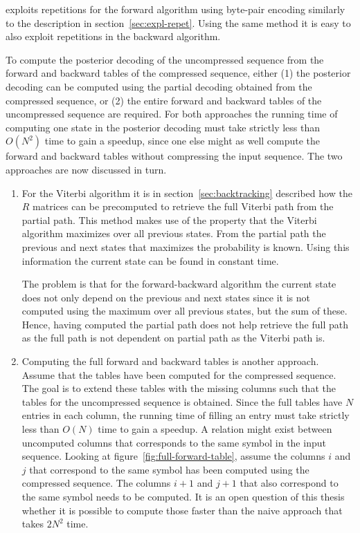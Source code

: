 \citet{sand2013ziphmmlib} exploits repetitions for the forward algorithm using
byte-pair encoding similarly to the description in
section~\ref{sec:expl-repet}. Using the same method it is easy to also exploit
repetitions in the backward algorithm.

To compute the posterior decoding of the uncompressed sequence from the
forward and backward tables of the compressed sequence, either (1) the
posterior decoding can be computed using the partial decoding obtained
from the compressed sequence, or (2) the entire forward and backward tables of
the uncompressed sequence are required. For both approaches the running time of
computing one state in the posterior decoding must take strictly less than
$O(N^2)$ time to gain a speedup, since one else might as well compute the
forward and backward tables without compressing the input sequence. The two
approaches are now discussed in turn.

\begin{enumerate}
\item For the Viterbi algorithm it is in section~\ref{sec:backtracking}
  described how the $R$ matrices can be precomputed to retrieve the full
  Viterbi path from the partial path. This method makes use of the property
  that the Viterbi algorithm maximizes over all previous states. From the
  partial path the previous and next states that maximizes the probability is
  known. Using this information the current state can be found in constant
  time.

  The problem is that for the forward-backward algorithm the current state does
  not only depend on the previous and next states since it is not computed using the
  maximum over all previous states, but the sum of these. Hence, having computed
  the partial path does not help retrieve the full path as the full path is
  not dependent on partial path as the Viterbi path is.
\item Computing the full forward and backward tables is another approach.
  Assume that the tables have been computed for the compressed sequence. The
  goal is to extend these tables with the missing columns such that the tables
  for the uncompressed sequence is obtained. Since the full tables have $N$
  entries in each column, the running time of filling an entry must take
  strictly less than $O(N)$ time to gain a speedup. A relation might exist
  between uncomputed columns that corresponds to the same symbol in the input
  sequence. Looking at figure~\ref{fig:full-forward-table}, assume the columns
  $i$ and $j$ that correspond to the same symbol has been computed using the
  compressed sequence. The columns $i + 1$ and $j + 1$ that also correspond to
  the same symbol needs to be computed. It is an open question of this thesis
  whether it is possible to compute those faster than the naive approach that
  takes $2N^2$ time.
\end{enumerate}

